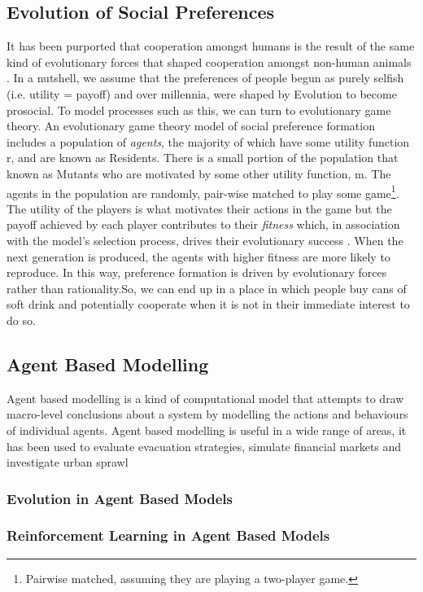 \documentclass[12pt]{article}
\begin{document}
\subsection{Evolution of Social Preferences}
It has been purported that cooperation amongst humans is the result of the same
kind of evolutionary forces that shaped cooperation amongst non-human animals
\cite{silk_evolution_2016}. In a nutshell, we assume that the preferences of
people begun as purely selfish (i.e. utility = payoff) and over millennia, were
shaped by Evolution to become prosocial. To model processes such as this, we
can turn to evolutionary game theory. An evolutionary game theory model of
social preference formation includes a population of \textit{agents}, the
majority of which have some utility function r, and are known as Residents.
There is a small portion of the population that known as Mutants who are
motivated by some other utility function, m. The agents in the population are
randomly, pair-wise matched to play some game\footnote{Pairwise matched,
assuming they are playing a two-player game.}. The utility of the players is
what motivates their actions in the game but the  payoff achieved by each
player contributes to their \textit{fitness} which, in association with the
model's selection process, drives their evolutionary success . When the next
generation is produced, the agents with higher fitness are more likely to
reproduce. In this way, preference formation is driven by evolutionary
forces rather than rationality.So, we can end up in a place in which people
buy cans of soft drink and potentially cooperate when it is not in their
immediate interest to do so.
\subsection{Agent Based Modelling}
Agent based modelling is a kind of computational model that attempts to draw
macro-level conclusions about a system by modelling the actions and behaviours
of individual agents. Agent based modelling is useful in a wide range of areas,
it has been used to evaluate evacuation strategies\cite{chen_agent-based_2008},
simulate financial markets \cite{deissenberg_eurace:_2008} and investigate
urban sprawl \cite{brown_effects_2006}
\subsubsection{Evolution in Agent Based Models} 

\subsubsection{Reinforcement Learning in Agent Based Models}
\end{document}

